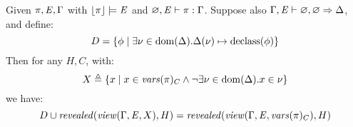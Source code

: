 \begin{lemma}
  Given $\pi, \mathit{E}, \Gamma$ with $\lfloor \pi \rfloor \models \mathit{E}$ and $\varnothing, \mathit{E} \vdash \pi : \Gamma$.
  Suppose also $\Gamma,\mathit{E} \vdash \varnothing,\varnothing \Rightarrow \Delta$, and define:
  $$D = \{ \phi \mid \exists \nu \in \mathrm{dom}(\Delta) . \Delta(\nu) \mapsto \mathrm{declass}(\phi) \}$$
  Then for any $H,C$, with:
  $$
  X \triangleq \{ x \mid x \in \mathit{vars}(\pi)_C \wedge \neg \exists \nu \in \mathrm{dom}(\Delta) . x \in \nu \}
  $$
  we have:
  $$
  D \cup  \mathit{revealed}(\mathit{view}(\Gamma,\mathit{E},X),H) = \mathit{revealed}(\mathit{view}(\Gamma,\mathit{E},\mathit{vars}(\pi)_C),H)
  $$
\end{lemma}

